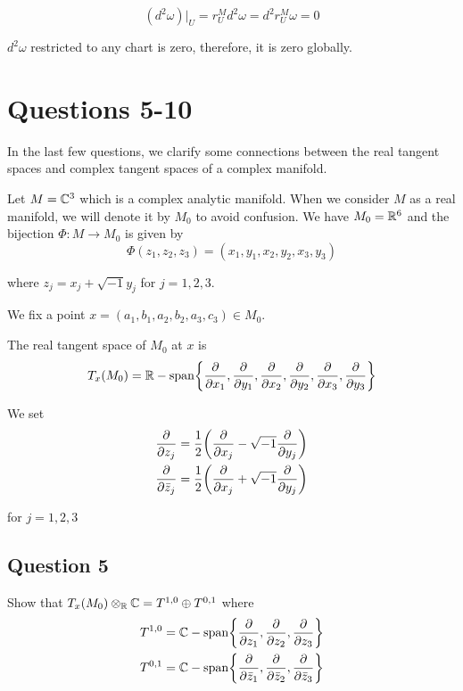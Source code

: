 \documentclass{article}
\begin{document}
$$
    (d^2 \omega)\vert_U = r^M_U d^2 \omega = d^2 r^M_U \omega = 0
$$

$d^2 \omega$ restricted to any chart is zero, therefore, it is zero globally.

\section{Questions 5-10}

In the last few questions, we clarify some connections between the real tangent spaces and complex tangent spaces of a complex manifold. 

Let $M = \mathbb{C}^3$ which is a complex analytic manifold. When we consider $M$ as a real manifold, we will denote it by $M_0$ to avoid confusion. We have $M_0 = \mathbb{R}^6$ and the bijection $\Phi: M \to M_0$ is given by
$$
    \Phi(z_1, z_2, z_3) = (x_1, y_1, x_2, y_2, x_3, y_3)
$$

where $z_j = x_j + \sqrt{-1} y_j$ for $j=1, 2, 3$.

We fix a point $x = (a_1, b_1, a_2, b_2, a_3, c_3) \in M_0$.

The real tangent space of $M_0$ at $x$ is
$$
    T_x(M_0) = \R-\Span \set*{\frac{\partial}{\partial x_1}, \frac{\partial}{\partial y_1}, \frac{\partial}{\partial x_2}, \frac{\partial}{\partial y_2}, \frac{\partial}{\partial x_3}, \frac{\partial}{\partial y_3}}
$$

We set 
\begin{align*}
    \frac{\partial }{\partial z_j} = \frac{1}{2} \tuple*{\frac{\partial}{\partial x_j} - \sqrt{-1} \frac{\partial}{\partial y_j}} \\
    \frac{\partial }{\partial \bar{z}_j} = \frac{1}{2} \tuple*{\frac{\partial}{\partial x_j} + \sqrt{-1} \frac{\partial}{\partial y_j}}
\end{align*}

for $j=1,2,3$

\subsection{Question 5}

Show that $T_x(M_0) \otimes_{\mathbb{R}} \mathbb{C} = T^{1,0} \oplus T^{0,1}$ where
\begin{align*}
    T^{1,0} = \C-\Span \set*{\frac{\partial}{\partial z_1}, \frac{\partial}{\partial z_2}, \frac{\partial}{\partial z_3}} \\
    T^{0, 1} = \C-\Span \set*{\frac{\partial}{\partial \bar{z}_1}, \frac{\partial}{\partial \bar{z}_2}, \frac{\partial}{\partial \bar{z}_3}} \\
\end{align*}
\end{document}
